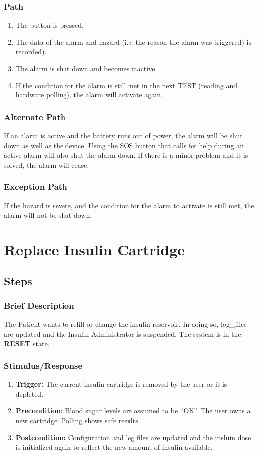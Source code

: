 \documentclass{scrreprt}
\begin{document}
    \subsubsection{Path}
    \begin{enumerate}
        \item The button is pressed.
        \item The data of the alarm and hazard (i.e. the reason the alarm was triggered) is recorded).
        \item The alarm is shut down and becomes inactive.
        \item If the condition for the alarm is still met in the next TEST (reading and hardware polling), the alarm will activate again.
    \end{enumerate}
    \subsubsection{Alternate Path}
        If an alarm is active and the battery runs out of power, the alarm will be shut down as well as the device. Using the SOS button that calls for help during an active alarm will also shut the alarm down. If there
        is a minor problem and it is solved, the alarm will cease.
    \subsubsection{Exception Path}
        If the hazard is severe, and the condition for the alarm to activate is still met, the alarm will not be shut down.

\section{Replace Insulin Cartridge}
\subsection{Steps}
    \subsubsection{Brief Description}
        The Patient wants to refill or change the insulin reservoir. In doing so, log\_files are updated and the Insulin Administrator is suspended. The system is in the \textbf{RESET} state.
    \subsubsection{Stimulus/Response}
    \begin{enumerate}
        \item \textbf{Trigger:} The current insulin cartridge is removed by the user or it is depleted.
        \item \textbf{Precondition:} Blood sugar levels are assumed to be “OK”. The user owns a new cartridge. Polling shows safe results.
        \item \textbf{Postcondition:} Configuration and log files are updated and the insluin dose is initialized again to reflect the new amount of insulin available. 
    \end{enumerate}
\end{document}
